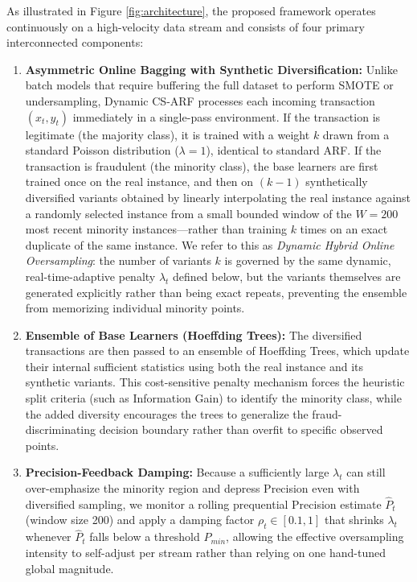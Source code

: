 \documentclass[review,12pt]{elsarticle}
\begin{document}
As illustrated in Figure \ref{fig:architecture}, the proposed framework operates continuously on a high-velocity data stream and consists of four primary interconnected components:

\begin{enumerate}
    \item \textbf{Asymmetric Online Bagging with Synthetic Diversification:} Unlike batch models that require buffering the full dataset to perform SMOTE or undersampling, Dynamic CS-ARF processes each incoming transaction $(x_t, y_t)$ immediately in a single-pass environment. If the transaction is legitimate (the majority class), it is trained with a weight $k$ drawn from a standard Poisson distribution ($\lambda=1$), identical to standard ARF. If the transaction is fraudulent (the minority class), the base learners are first trained once on the real instance, and then on $(k-1)$ synthetically diversified variants obtained by linearly interpolating the real instance against a randomly selected instance from a small bounded window of the $W{=}200$ most recent minority instances---rather than training $k$ times on an exact duplicate of the same instance. We refer to this as \textit{Dynamic Hybrid Online Oversampling}: the number of variants $k$ is governed by the same dynamic, real-time-adaptive penalty $\lambda_t$ defined below, but the variants themselves are generated explicitly rather than being exact repeats, preventing the ensemble from memorizing individual minority points.
    \item \textbf{Ensemble of Base Learners (Hoeffding Trees):} The diversified transactions are then passed to an ensemble of Hoeffding Trees, which update their internal sufficient statistics using both the real instance and its synthetic variants. This cost-sensitive penalty mechanism forces the heuristic split criteria (such as Information Gain) to identify the minority class, while the added diversity encourages the trees to generalize the fraud-discriminating decision boundary rather than overfit to specific observed points.
    \item \textbf{Precision-Feedback Damping:} Because a sufficiently large $\lambda_t$ can still over-emphasize the minority region and depress Precision even with diversified sampling, we monitor a rolling prequential Precision estimate $\hat{P}_t$ (window size 200) and apply a damping factor $\rho_t \in [0.1, 1]$ that shrinks $\lambda_t$ whenever $\hat{P}_t$ falls below a threshold $P_{min}$, allowing the effective oversampling intensity to self-adjust per stream rather than relying on one hand-tuned global magnitude.

\end{enumerate}
\end{document}
